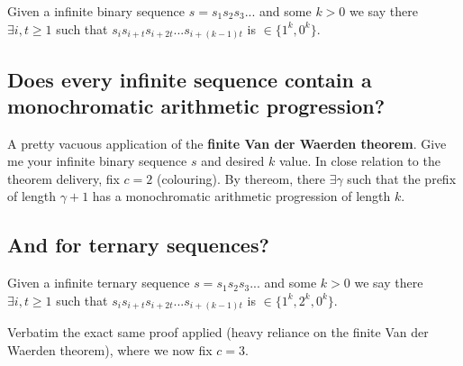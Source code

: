 \documentclass{article}
\begin{document}
Given a infinite binary sequence $s = s_{1}s_{2}s_{3}...$ and some $k>0$ we say there $\exists i,t \geq 1$ such that $s_{i}s_{i+t}s_{i+2t}...s_{i+(k-1)t}$ is $\in \{1^k,0^k\}$.

\subsection{Does every infinite sequence contain a monochromatic arithmetic progression?}
A pretty vacuous application of the \textbf{finite Van der Waerden theorem}. Give me your infinite binary sequence $s$ and desired $k$ value. In close relation to the theorem delivery, fix $c = 2$ (colouring). By thereom, there $\exists \gamma$ such that the prefix of length $\gamma + 1$ has a monochromatic arithmetic progression of length $k$.

\subsection{And for ternary sequences?} 
Given a infinite ternary sequence $s = s_{1}s_{2}s_{3}...$ and some $k>0$ we say there $\exists i,t \geq 1$ such that $s_{i}s_{i+t}s_{i+2t}...s_{i+(k-1)t}$ is $\in \{1^k,2^k,0^k\}$.

Verbatim the exact same proof applied (heavy reliance on the finite Van der Waerden theorem), where we now fix $c = 3$.
\end{document}
